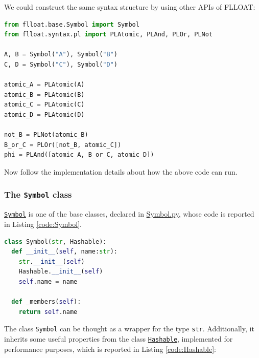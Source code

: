 We could construct the same syntax structure by using other APIs of FLLOAT:

\begin{lstlisting}[language=Python, style=Python, label={code:pl-syntax-example-manual}, caption={A "manually" constructed \PL formula.}]
from flloat.base.Symbol import Symbol
from flloat.syntax.pl import PLAtomic, PLAnd, PLOr, PLNot

A, B = Symbol("A"), Symbol("B")
C, D = Symbol("C"), Symbol("D")

atomic_A = PLAtomic(A)
atomic_B = PLAtomic(B)
atomic_C = PLAtomic(C)
atomic_D = PLAtomic(D)

not_B = PLNot(atomic_B)
B_or_C = PLOr([not_B, atomic_C])
phi = PLAnd([atomic_A, B_or_C, atomic_D])
\end{lstlisting}

Now follow the implementation details about how the above code can run.

\subsubsection{The \texttt{Symbol} class}
\href{https://github.com/MarcoFavorito/flloat/blob/0.1.4/flloat/base/Symbol.py#L6-L14}{\texttt{Symbol}} is one of the base classes, declared in \href{https://github.com/MarcoFavorito/flloat/blob/0.1.4/flloat/base/Symbol.py}{Symbol.py}, whose code is reported in Listing \ref{code:Symbol}.

\begin{lstlisting}[language=Python, style=Python, escapechar = £, label={code:Symbol}, caption={The \texttt{Symbol} class.}]
class Symbol(str, Hashable):
  def __init__(self, name:str):
    str.__init__(self)
    Hashable.__init__(self)
    self.name = name
    
  def _members(self):
    return self.name

\end{lstlisting}

The class \texttt{Symbol} can be thought as a wrapper for the type \texttt{str}. Additionally, it inherits some useful properties from the class \href{https://github.com/MarcoFavorito/flloat/blob/0.1.4/flloat/base/hashable.py#L1-L31}{\texttt{Hashable}}, implemented for performance purposes, which is reported in Listing \ref{code:Hashable}:

